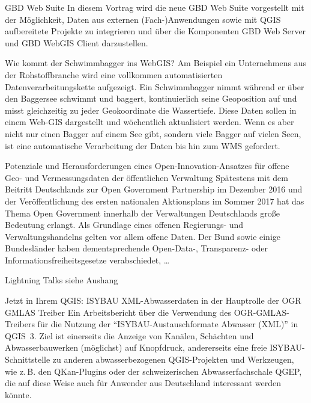\renewcommand{\conferenceDay}{\donnerstag}

%
{GBD Web Suite}{}%
{
In diesem Vortrag wird die neue GBD Web Suite vorgestellt mit der Möglichkeit, Daten aus externen
(Fach-)Anwendungen sowie mit QGIS aufbereitete Projekte zu integrieren und über die Komponenten GBD
Web Server und GBD WebGIS Client darzustellen.%
}

%
{Wie kommt der Schwimmbagger ins WebGIS?}%
{}%
{%
Am Beispiel ein Unternehmens aus der Rohstoffbranche wird eine vollkommen automatisierten
Datenverarbeitungskette aufgezeigt. Ein Schwimmbagger nimmt während er über den Baggersee schwimmt
und baggert, kontinuierlich seine Geoposition auf und misst gleichzeitig zu jeder Geokoordinate die
Wassertiefe. Diese Daten sollen in einem Web-GIS dargestellt und wöchentlich aktualisiert werden.
Wenn es aber nicht nur einen Bagger auf einem See gibt, sondern viele Bagger auf vielen Seen, ist
eine automatische Verarbeitung der Daten bis hin zum WMS gefordert.%
}


%
{Potenziale und Herausforderungen eines Open-Innovation-Ansatzes für offene Geo- und
Vermessungsdaten der öffentlichen Verwaltung}%
{}%
{%
Spätestens mit dem Beitritt Deutschlands zur Open Government Partnership im Dezember 2016 und der
Veröffentlichung des ersten nationalen Aktionsplans im Sommer 2017 hat das Thema Open Government
innerhalb der Verwaltungen Deutschlands große Bedeutung erlangt. Als Grundlage eines offenen
Regierungs- und Verwaltungshandelns gelten vor allem offene Daten. Der Bund sowie einige
Bundesländer haben dementsprechende Open-Data-, Transparenz- oder Informationsfreiheitsgesetze
verabschiedet, \dots%
}

\abstractAPH{}%
{Lightning Talks}%
{}%
{%
siehe Aushang%
}

%
{Jetzt in Ihrem QGIS: ISYBAU XML-Abwasserdaten}%
{in der Hauptrolle der OGR GMLAS Treiber}%
{%
Ein Arbeitsbericht über die Verwendung des OGR-GMLAS-Treibers für die Nutzung der
"`ISYBAU-Austauschformate Abwasser (XML)"' in QGIS~3.  Ziel ist einerseits die Anzeige von Kanälen,
Schächten und Abwasserbauwerken (möglichst) auf Knopfdruck, andererseits eine freie
ISYBAU-Schnittstelle zu anderen abwasserbezogenen QGIS-Projekten und Werkzeugen, wie z.\,B. den
QKan-Plugins oder der schweizerischen Abwasserfachschale QGEP, die auf diese Weise auch für Anwender
aus Deutschland interessant werden könnte.%
}

